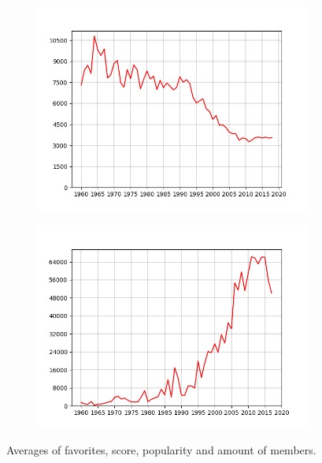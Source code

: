 \begin{frame}
\begin{figure}
\begin{subfigure}{.4\columnwidth}
		\includegraphics[width=\columnwidth]{graphics/avgPopularities.png}
	\end{subfigure}%
	\begin{subfigure}{.4\columnwidth}
		\centering
		\includegraphics[width=\columnwidth]{graphics/avgMembers.png}
	\end{subfigure}
	\caption{Averages of favorites, score, popularity and amount of members.}
\end{figure}
\end{frame}

